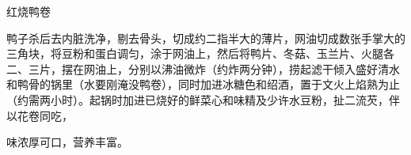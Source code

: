 \begin{recipe}{红烧鸭卷}

\ingredients







\cooking

鸭子杀后去内脏洗净，剔去骨头，切成约二指半大的薄片，网油切成数张手掌大的三角块，将豆粉和蛋白调匀，涂于网油上，然后将鸭片、冬菇、玉兰片、火腿各二、三片，摆在网油上，分别以沸油微炸（约炸两分钟），捞起滤干倾入盛好清水和鸭骨的锅里（水要刚淹没鸭卷），同时加进冰糖色和绍酒，置于文火上焰熟为止（约需两小时）。起锅时加进已烧好的鲜菜心和味精及少许水豆粉，扯二流芡，伴以花卷同吃，

\notes

味浓厚可口，营养丰富。

\end{recipe}

